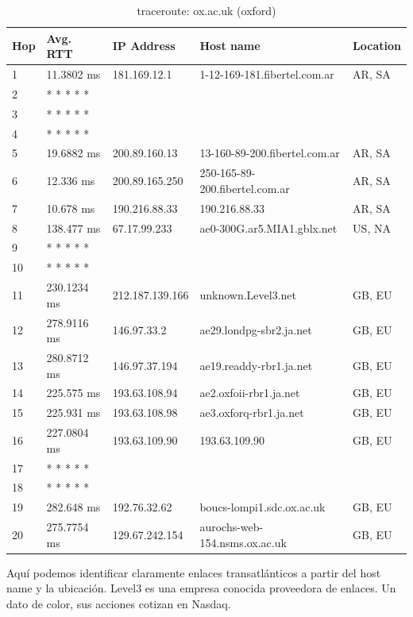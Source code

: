 \begin{table}[H]
\caption{traceroute: ox.ac.uk (oxford)}
\centering
\begin{tabular}{@{}lllll@{}}
\toprule
Hop & Avg. RTT & IP Address & Host name & Location\\ \midrule
1 & 11.3802 ms & 181.169.12.1 & 1-12-169-181.fibertel.com.ar & AR, SA\\
2 &  * * * * * &  &  &  \\
3 &  * * * * * &  &  &  \\
4 &  * * * * * &  &  &  \\
5 & 19.6882 ms & 200.89.160.13 & 13-160-89-200.fibertel.com.ar & AR, SA\\
6 & 12.336 ms & 200.89.165.250 & 250-165-89-200.fibertel.com.ar & AR, SA\\
7 & 10.678 ms & 190.216.88.33 & 190.216.88.33 & AR, SA\\
8 & 138.477 ms & 67.17.99.233 & ae0-300G.ar5.MIA1.gblx.net & US, NA\\
9 &  * * * * * &  &  &  \\
10 &  * * * * * &  &  &  \\
11 & 230.1234 ms & 212.187.139.166 & unknown.Level3.net & GB, EU\\
12 & 278.9116 ms & 146.97.33.2 & ae29.londpg-sbr2.ja.net & GB, EU\\
13 & 280.8712 ms & 146.97.37.194 & ae19.readdy-rbr1.ja.net & GB, EU\\
14 & 225.575 ms & 193.63.108.94 & ae2.oxfoii-rbr1.ja.net & GB, EU\\
15 & 225.931 ms & 193.63.108.98 & ae3.oxforq-rbr1.ja.net & GB, EU\\
16 & 227.0804 ms & 193.63.109.90 & 193.63.109.90 & GB, EU\\
17 &  * * * * * &  &  &  \\
18 &  * * * * * &  &  &  \\
19 & 282.648 ms & 192.76.32.62 & boucs-lompi1.sdc.ox.ac.uk & GB, EU\\
20 & 275.7754 ms & 129.67.242.154 & aurochs-web-154.nsms.ox.ac.uk & GB, EU\\ \bottomrule
\end{tabular}
\label{oxford}
\end{table}

Aquí podemos identificar claramente enlaces transatlánticos a partir del host name y la ubicación. Level3 es una empresa conocida proveedora de enlaces. Un dato de color, sus acciones cotizan en Nasdaq.

